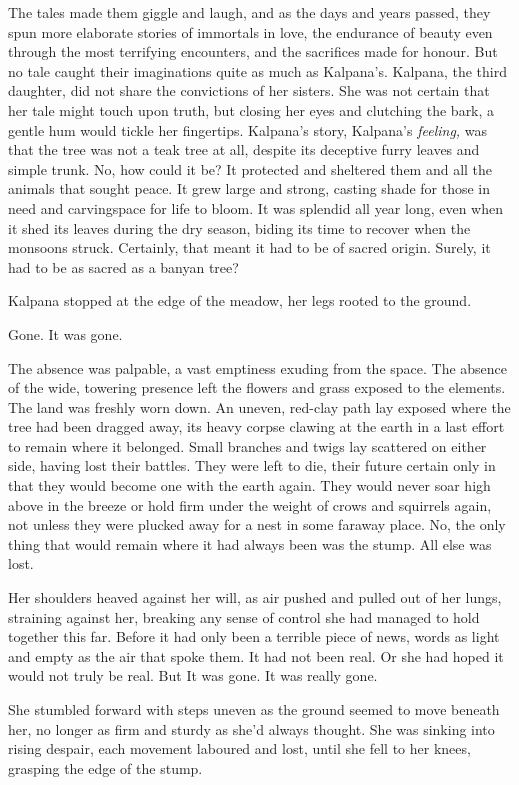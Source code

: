 The tales made them giggle and laugh, and as the days and years
passed, they spun more elaborate stories of immortals in love, the
endurance of beauty even through the most terrifying encounters, and
the sacrifices made for honour. But no tale caught their imaginations
quite as much as Kalpana's. Kalpana, the third daughter, did not share
the convictions of her sisters. She was not certain that her tale
might touch upon truth, but closing her eyes and clutching the bark, a
gentle hum would tickle her fingertips. Kalpana's story, Kalpana's
\emph{feeling,} was that the tree was not a teak tree at all, despite its
deceptive furry leaves and simple trunk. No, how could it be? It
protected and sheltered them and all the animals that sought peace. It
grew large and strong, casting shade for those in need and
carvingspace for life to bloom. It was splendid all year long, even
when it shed its leaves during the dry season, biding its time to
recover when the monsoons struck. Certainly, that meant it had to be
of sacred origin. Surely, it had to be as sacred as a banyan tree?

Kalpana stopped at the edge of the meadow, her legs rooted to the
ground.

Gone. It was gone.

The absence was palpable, a vast emptiness exuding from the space. The
absence of the wide, towering presence left the flowers and grass
exposed to the elements. The land was freshly worn down. An uneven,
red-clay path lay exposed where the tree had been dragged away, its
heavy corpse clawing at the earth in a last effort to remain where it
belonged. Small branches and twigs lay scattered on either side,
having lost their battles. They were left to die, their future certain
only in that they would become one with the earth again. They would
never soar high above in the breeze or hold firm under the weight of
crows and squirrels again, not unless they were plucked away for a
nest in some faraway place. No, the only thing that would remain where
it had always been was the stump. All else was lost.

Her shoulders heaved against her will, as air pushed and pulled out of
her lungs, straining against her, breaking any sense of control she
had managed to hold together this far. Before it had only been a
terrible piece of news, words as light and empty as the air that spoke
them. It had not been real. Or she had hoped it would not truly be
real. But \textellipsis It was gone. It was really gone.

She stumbled forward with steps uneven as the ground seemed to move
beneath her, no longer as firm and sturdy as she'd always thought. She
was sinking into rising despair, each movement laboured and lost,
until she fell to her knees, grasping the edge of the stump.

